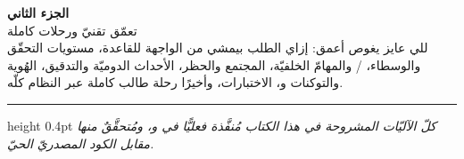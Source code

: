 \documentclass[12pt,a4paper]{article}
\begin{document}
\clearpage
\begin{mdframed}[style=spbase,linewidth=0pt,roundcorner=4pt,
   backgroundcolor=spAccent,innertopmargin=14pt,innerbottommargin=14pt]
{\color{white}\Huge\bfseries الجزء الثاني}\\[4pt]
{\color{white}\LARGE تعمّق تقنيّ ورحلات كاملة}\\[6pt]
{\color{white}\normalsize للي عايز يغوص أعمق: إزاي الطلب بيمشي من الواجهة للقاعدة،
مستويات التحقّق والوسطاء، \slash{} والمهامّ الخلفيّة،
المجتمع والحظر، الأحداث الدوميّة والتدقيق، الهُوية والتوكنات و،
الاختبارات، وأخيرًا رحلة طالب كاملة عبر النظام كلّه.}
\end{mdframed}
\clearpage

\clearpage

\clearpage

\clearpage

\clearpage

\clearpage

\clearpage

\clearpage

\clearpage

\clearpage

\clearpage

\clearpage


\vspace{10pt}\hrule height 0.4pt\vspace{4pt}
{\small\itshape\color{spInk}
كلّ الآليّات المشروحة في هذا الكتاب مُنفَّذة فعليًّا في 
و، ومُتحقَّقٌ منها مقابل الكود المصدريّ الحيّ.}
\end{document}
